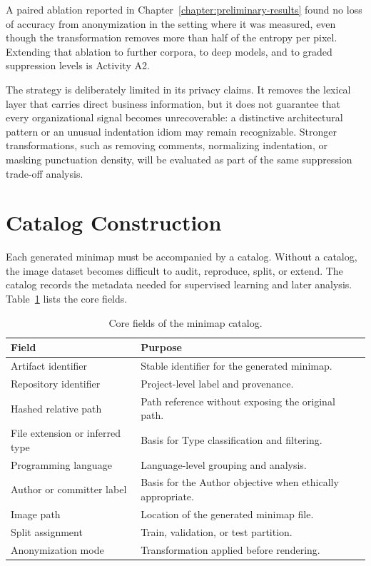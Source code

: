 A paired ablation reported in Chapter~\ref{chapter:preliminary-results} found no
loss of accuracy from anonymization in the setting where it was measured, even
though the transformation removes more than half of the entropy per pixel.
Extending that ablation to further corpora, to deep models, and to graded
suppression levels is Activity A2.

The strategy is deliberately limited in its privacy claims. It removes the
lexical layer that carries direct business information, but it does not
guarantee that every organizational signal becomes unrecoverable: a distinctive
architectural pattern or an unusual indentation idiom may remain recognizable.
Stronger transformations, such as removing comments, normalizing indentation,
or masking punctuation density, will be evaluated as part of the same
suppression trade-off analysis.

\section{Catalog Construction}

Each generated minimap must be accompanied by a catalog. Without a catalog, the
image dataset becomes difficult to audit, reproduce, split, or extend. The
catalog records the metadata needed for supervised learning and later analysis.
Table~\ref{tab:catalog-fields} lists the core fields.

\begin{table}[ht]
\centering
\caption{Core fields of the minimap catalog.}
\label{tab:catalog-fields}
\begin{tabular}{p{}p{}}
\toprule
\textbf{Field} & \textbf{Purpose} \\
\midrule
Artifact identifier & Stable identifier for the generated minimap. \\
Repository identifier & Project-level label and provenance. \\
Hashed relative path & Path reference without exposing the original path. \\
File extension or inferred type & Basis for Type classification and filtering. \\
Programming language & Language-level grouping and analysis. \\
Author or committer label & Basis for the Author objective when ethically appropriate. \\
Image path & Location of the generated minimap file. \\
Split assignment & Train, validation, or test partition. \\
Anonymization mode & Transformation applied before rendering. \\
\bottomrule
\end{tabular}
\fautor
\end{table}


